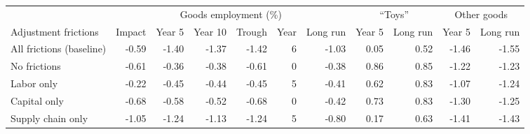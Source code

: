 \begin{tabular}{lrrrrrrrrrr}
\toprule
 & \multicolumn{6}{c}{Goods employment (\%)} & \multicolumn{2}{c}{``Toys''} & \multicolumn{2}{c}{Other goods} \\
\cmidrule(lr){2-7}\cmidrule(lr){8-9}\cmidrule(lr){10-11}
Adjustment frictions & Impact & Year 5 & Year 10 & Trough & Year & Long run & Year 5 & Long run & Year 5 & Long run \\
\midrule
All frictions (baseline) & -0.59 & -1.40 & -1.37 & -1.42 & 6 & -1.03 & 0.05 & 0.52 & -1.46 & -1.55 \\
\midrule
No frictions & -0.61 & -0.36 & -0.38 & -0.61 & 0 & -0.38 & 0.86 & 0.85 & -1.22 & -1.23 \\
Labor only & -0.22 & -0.45 & -0.44 & -0.45 & 5 & -0.41 & 0.62 & 0.83 & -1.07 & -1.24 \\
Capital only & -0.68 & -0.58 & -0.52 & -0.68 & 0 & -0.42 & 0.73 & 0.83 & -1.30 & -1.25 \\
Supply chain only & -1.05 & -1.24 & -1.13 & -1.24 & 5 & -0.80 & 0.17 & 0.63 & -1.41 & -1.43 \\
\bottomrule
\end{tabular}

